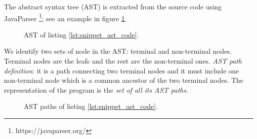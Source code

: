 \noindent The abstract syntax tree (AST) is extracted from the source code using JavaParser \footnote{https://javaparser.org/}; see an example in figure  \ref{fig:AST_graphviz}.



\begin{figure}
 \centering
 \resizebox{\columnwidth}{!}{
 
%  
 }
 \caption[AST for listing \ref{lst:snippet_ast_code}.]{AST of listing \ref{lst:snippet_ast_code}.}
    \label{fig:AST_graphviz}
\end{figure}

	
We identify two sets of node in the AST: terminal and non-terminal nodes. Terminal nodes are the leafs and the rest are the non-terminal ones.
\textit{AST path definition}: it is a path connecting two terminal nodes and it must include one non-terminal node which is a common ancestor of the two terminal nodes. 
The representation of the program is the \textit{set of all its AST paths}. 

\begin{figure}
 \centering
 \caption[All AST paths for listing \ref{lst:snippet_ast_code}.]{AST paths of listing \ref{lst:snippet_ast_code}.}
    \label{fig:AST_paths}
\end{figure}


